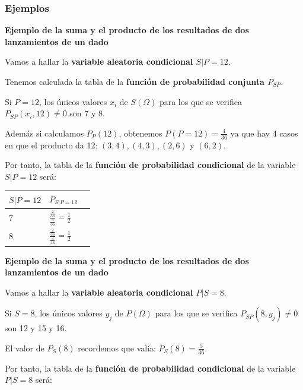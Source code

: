 \documentclass[]{book}
\begin{document}
\hypertarget{ejemplos-6}{%
\subsubsection{Ejemplos}\label{ejemplos-6}}

\textbf{Ejemplo de la suma y el producto de los resultados de dos lanzamientos de un dado}

Vamos a hallar la \textbf{variable aleatoria condicional \(S|P=12\)}.

Tenemos calculada la tabla de la \textbf{función de probabilidad conjunta \(P_{SP}\)}.

Si \(P=12\), los únicos valores \(x_i\) de \(S(\Omega)\) para los que se verifica \(P_{SP}(x_i,12)\neq 0\) son 7 y 8.

Además si calculamos \(P_P(12)\), obtenemos \(P(P=12)=\frac{4}{36}\) ya que hay 4 casos en que el producto da 12: \((3,4), (4,3), (2,6)\) y \((6,2)\).

Por tanto, la tabla de la \textbf{función de probabilidad condicional} de la variable \(S|P=12\) será:

\begin{longtable}[]{@{}lll@{}}
\toprule
\(S|P=12\) & \(P_{S|P=12}\) &\tabularnewline
\midrule
\endhead
\(7\) & \(\frac{\frac{2}{36}}{\frac{4}{36}}=\frac{1}{2}\) &\tabularnewline
\(8\) & \(\frac{\frac{2}{36}}{\frac{4}{36}}=\frac{1}{2}\) &\tabularnewline
\bottomrule
\end{longtable}

\textbf{Ejemplo de la suma y el producto de los resultados de dos lanzamientos de un dado}

Vamos a hallar la \textbf{variable aleatoria condicional \(P|S=8\)}.

Si \(S=8\), los únicos valores \(y_j\) de \(P(\Omega)\) para los que se verifica \(P_{SP}(8,y_j)\neq 0\) son 12 y 15 y 16.

El valor de \(P_S(8)\) recordemos que valía: \(P_S(8)=\frac{5}{36}\).

Por tanto, la tabla de la \textbf{función de probabilidad condicional} de la variable \(P|S=8\) será:
\end{document}
